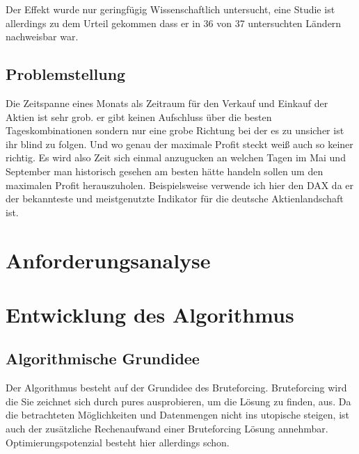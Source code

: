 \documentclass[12pt, a4paper, titlepage]{report}
\begin{document}
            Der Effekt wurde nur geringfügig Wissenschaftlich untersucht, eine
            Studie ist allerdings zu dem Urteil gekommen dass er in 36 von 37
            untersuchten Ländern nachweisbar war\cite{bouman2002halloween}.

        \section{Problemstellung}
            Die Zeitspanne eines Monats als Zeitraum für den Verkauf und Einkauf
            der Aktien ist sehr grob. er gibt keinen Aufschluss über die besten
            Tageskombinationen sondern nur eine grobe Richtung bei der es zu
            unsicher ist ihr blind zu folgen. Und wo genau der maximale Profit
            steckt weiß auch so keiner richtig. Es wird also Zeit sich einmal
            anzugucken an welchen Tagen im Mai und September man historisch
            gesehen am besten hätte handeln sollen um den maximalen Profit
            herauszuholen. Beispielsweise verwende ich hier den DAX da er der
            bekannteste und meistgenutzte Indikator für die deutsche
            Aktienlandschaft ist.

    \chapter{Anforderungsanalyse}

    \chapter{Entwicklung des Algorithmus}

        \section{Algorithmische Grundidee}
            Der Algorithmus besteht auf der Grundidee des Bruteforcing.
            Bruteforcing wird die %
            Sie zeichnet sich durch pures ausprobieren, um die Lösung zu finden,
            aus. Da die betrachteten Möglichkeiten und Datenmengen nicht ins
            utopische steigen, ist auch der zusätzliche Rechenaufwand einer
            Bruteforcing Lösung annehmbar. Optimierungspotenzial besteht hier
            allerdings schon.
\end{document}
